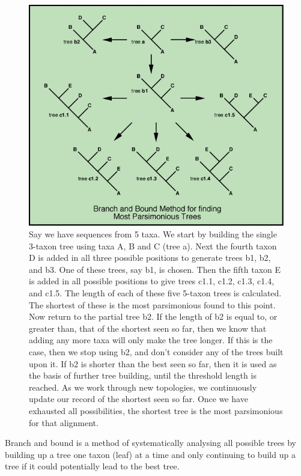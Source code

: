 \documentclass[11pt]{article}
\begin{document}
\begin{figure}[hbtp]
\includegraphics[width=14cm]{figures/parsimony}
\caption{ Say we have sequences from 5 taxa. We start by building the single 3-taxon tree using taxa A, B and C (tree a). Next the fourth taxon D is added in all three possible positions to generate trees b1, b2, and b3. One of these trees, say b1, is chosen. Then the fifth taxon E is added in all possible positions to give trees c1.1, c1.2, c1.3, c1.4, and c1.5. The length of each of these five 5-taxon trees is calculated. The shortest of these is the most parsimonious found to this point. 
Now return to the partial tree b2. If the length of b2 is equal to, or greater than, that of the shortest seen so far, then we know that adding any more taxa will only make the tree longer. If this is the case, then we stop using b2, and don't consider any of the trees built upon it. If b2 is shorter than the best seen so far, then it is used as the basis of further tree building, until the threshold length is reached. 
As we work through new topologies, we continuously update our record of the shortest seen so far. Once we have exhausted all possibilities, the shortest tree is the most parsimonious for that alignment. }
\label{fig:parsimony}
\end{figure}


Branch and bound is a method of systematically analysing  all possible trees by building up a tree one taxon (leaf) at a time and only continuing to build up a tree if it could potentially lead to the best tree.
\end{document}
